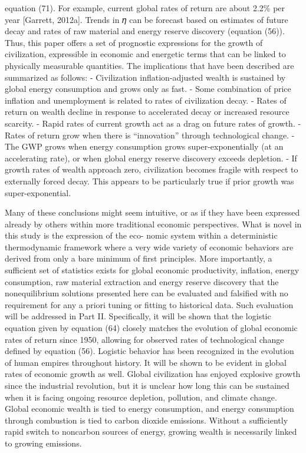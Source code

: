 \documentclass[
]{book}
\begin{document}
equation (71). For example, current global rates of return are about 2.2\% per year {[}Garrett, 2012a{]}. Trends
in 𝜂 can be forecast based on estimates of future decay and rates of raw material and energy reserve
discovery (equation (56)).
Thus, this paper oﬀers a set of prognostic expressions for the growth of civilization, expressible in
economic and energetic terms that can be linked to physically measurable quantities. The implications
that have been described are summarized as follows:
- Civilization inﬂation-adjusted wealth is sustained by global energy consumption and grows only as fast.
- Some combination of price inﬂation and unemployment is related to rates of civilization decay.
- Rates of return on wealth decline in response to accelerated decay or increased resource scarcity.
- Rapid rates of current growth act as a drag on future rates of growth.
- Rates of return grow when there is ``innovation'' through technological change.
- The GWP grows when energy consumption grows super-exponentially (at an accelerating rate), or when global energy reserve discovery exceeds depletion.
- If growth rates of wealth approach zero, civilization becomes fragile with respect to externally forced
decay. This appears to be particularly true if prior growth was super-exponential.

Many of these conclusions might seem intuitive, or as if they have been expressed already by others
within more traditional economic perspectives. What is novel in this study is the expression of the eco-
nomic system within a deterministic thermodynamic framework where a very wide variety of economic
behaviors are derived from only a bare minimum of ﬁrst principles.
More importantly, a suﬃcient set of statistics exists for global economic productivity, inﬂation, energy
consumption, raw material extraction and energy reserve discovery that the nonequilibrium solutions
presented here can be evaluated and falsiﬁed with no requirement for any a priori tuning or ﬁtting to
historical data. Such evaluation will be addressed in Part II. Speciﬁcally, it will be shown that the logistic
equation given by equation (64) closely matches the evolution of global economic rates of return since
1950, allowing for observed rates of technological change deﬁned by equation (56). Logistic behavior has
been recognized in the evolution of human empires throughout history. It
will be shown to be evident in global rates of economic growth as well.
Global civilization has enjoyed explosive growth since the industrial revolution, but it is unclear how long
this can be sustained when it is facing ongoing resource depletion, pollution, and climate change. Global
economic wealth is tied to energy consumption, and energy consumption through combustion is tied to
carbon dioxide emissions. Without a suﬃciently rapid switch to noncarbon sources of energy, growing
wealth is necessarily linked to growing emissions.
\end{document}

